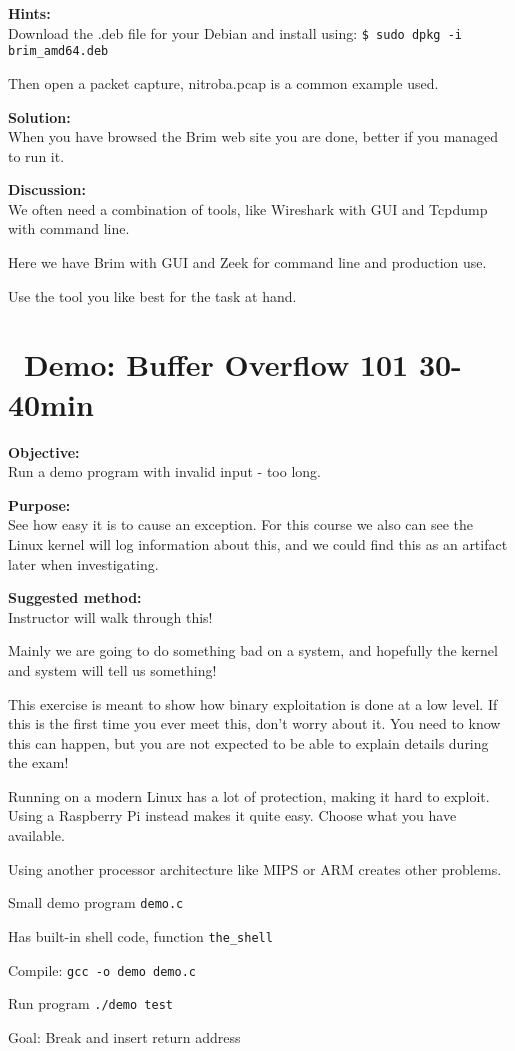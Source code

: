 \documentclass[a4paper,11pt,notitlepage]{report}
\begin{document}
{\bf Hints:}\\
Download the .deb file for your Debian and install using:
\verb+$ sudo dpkg -i brim_amd64.deb+

Then open a packet capture, nitroba.pcap is a common example used.

{\bf Solution:}\\
When you have browsed the Brim web site you are done, better if you managed to run it.

{\bf Discussion:}\\
We often need a combination of tools, like Wireshark with GUI and Tcpdump with command line.

Here we have Brim with GUI and Zeek for command line and production use.

Use the tool you like best for the task at hand.



\chapter{\faInfoCircle\ Demo: Buffer Overflow 101 30-40min}
\label{ex:bufferoverflow}


{\bf Objective:}\\
Run a demo program with invalid input - too long.

{\bf Purpose:}\\
See how easy it is to cause an exception. For this course we also can see the Linux kernel will log information about this, and we could find this as an artifact later when investigating.

{\bf Suggested method:}\\
Instructor will walk through this!

{\Large
Mainly we are going to do something bad on a system, and hopefully the kernel and system will tell us something!

This exercise is meant to show how binary exploitation is done at a low level. If this is the first time you ever meet this, don't worry about it. You need to know this can happen, but you are not expected to be able to explain details during the exam!}

Running on a modern Linux has a lot of protection, making it hard to exploit. Using a Raspberry Pi instead makes it quite easy. Choose what you have available.

Using another processor architecture like MIPS or ARM creates other problems.

\begin{list2}
\item Small demo program \verb+demo.c+
\item Has built-in shell code, function \verb+the_shell+
\item Compile:
\verb+gcc -o demo demo.c+
\item Run program
\verb+./demo test+
\item Goal: Break and insert return address
\end{list2}
\end{document}

